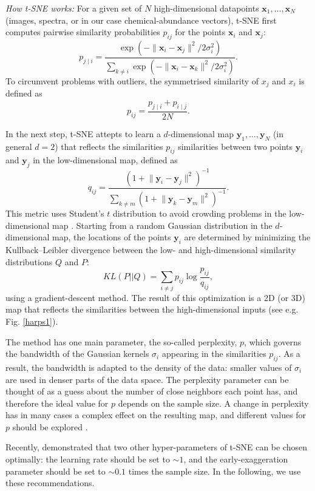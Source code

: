 \documentclass{aa}  %
\begin{document}
{\it How t-SNE works:} For a given set of $N$ high-dimensional datapoints $\mathbf{x}_1, \dots, \mathbf{x}_N$ (images, spectra, or in our case chemical-abundance vectors), t-SNE first computes pairwise similarity probabilities $p_{ij}$ for the points $\mathbf{x}_i$ and $\mathbf{x}_j$:
$$p_{j\mid i} = \frac{\exp(-\lVert\mathbf{x}_i - \mathbf{x}_j\rVert^2 / 2\sigma_i^2)}{\sum_{k \neq i} \exp(-\lVert\mathbf{x}_i - \mathbf{x}_k\rVert^2 / 2\sigma_i^2)}.$$
To circumvent problems with outliers, the symmetrised similarity of $x_j$ and $x_i$ is defined as 
$$p_{ij} = \frac{p_{j\mid i} + p_{i\mid j}}{2N}.$$

In the next step, t-SNE attepts to learn a $d$-dimensional map $\mathbf{y}_1, \dots, \mathbf{y}_N$ (in general $d=2$) that reflects the similarities  $p_{ij}$ similarities between two points $\mathbf{y}_i$ and $\mathbf{y}_j$ in the low-dimensional map, defined as
$$q_{ij} = \frac{(1 + \lVert \mathbf{y}_i - \mathbf{y}_j\rVert^2)^{-1}}{\sum_{k \neq m} (1 + \lVert \mathbf{y}_k - \mathbf{y}_m\rVert^2)^{-1}}.$$
This metric uses Student's $t$ distribution to avoid crowding problems in the low-dimensional map \citep{vanderMaaten2008}. Starting from a random Gaussian distribution in the $d$-dimensional map, the locations of the points $\mathbf{y}_i$ are determined by minimizing the Kullback–Leibler divergence \citep{Kullback1951} between the low- and high-dimensional similarity distributions $Q$ and $P$:
$$KL(P||Q) = \sum_{i \neq j} p_{ij} \log \frac{p_{ij}}{q_{ij}},$$
using a gradient-descent method. The result of this optimization is a 2D (or 3D) map that reflects the similarities between the high-dimensional inputs (see e.g. Fig. \ref{harps1}).

The method has one main parameter, the so-called perplexity, $p$, which governs the bandwidth of the Gaussian kernels $\sigma_i$ appearing in the similarities $p_{ij}$. As a result, the bandwidth is adapted to the density of the data: smaller values of $\sigma_i$ are used in denser parts of the data space. The perplexity parameter can be thought of as a guess about the number of close neighbors each point has, and therefore the ideal value for $p$ depends on the sample size. A change in perplexity has in many cases a complex effect on the resulting map, and different values for $p$ should be explored \citep{Wattenberg2016}. 

Recently, \citet{Linderman2017} demonstrated that two other hyper-parameters of t-SNE can be chosen optimally: the learning rate should be set to $\sim 1$, and the early-exaggeration parameter should be set to $\sim 0.1$ times the sample size. In the following, we use these recommendations.
\end{document}
